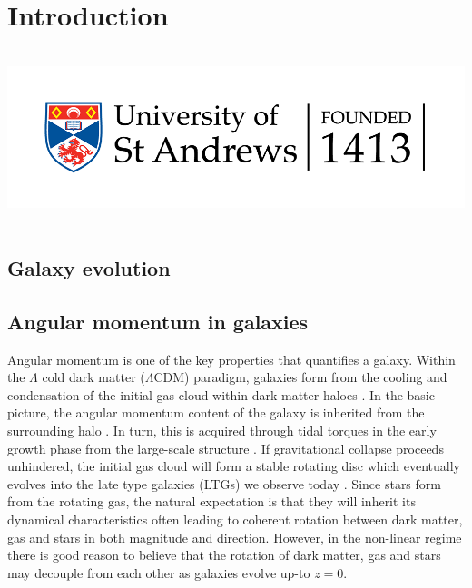 \chapter{Introduction}
\vspace{-5in}
\includegraphics[height=2.0in]{thesis/latex/st_a_logo_.png}
\vspace{3in}

\label{ch:intro}
\section{Galaxy evolution}
\section{Angular momentum in galaxies} \label{sec:ang_mom_intro}
Angular momentum is one of the key properties that quantifies a galaxy. Within the $\Lambda$ cold dark matter ($\Lambda$CDM) paradigm, galaxies form from the cooling and condensation of the initial gas cloud within dark matter haloes \citep{white1978, mo1998}. In the basic picture, the angular momentum content of the galaxy is inherited from the surrounding halo \citep[][]{fall1980}. In turn, this is acquired through tidal torques in the early growth phase from the large-scale structure \citep[e.g.][]{peebles1969, Doroshkevich1970}. If gravitational collapse proceeds unhindered, the initial gas cloud will form a stable rotating disc which eventually evolves into the late type galaxies (LTGs) we observe today \citep{white1978}. Since stars form from the rotating gas, the natural expectation is that they will inherit its dynamical characteristics often leading to coherent rotation between dark matter, gas and stars in both magnitude and direction. However, in the non-linear regime there is good reason to believe that the rotation of dark matter, gas and stars may decouple from each other as galaxies evolve up-to $z=0$. 

